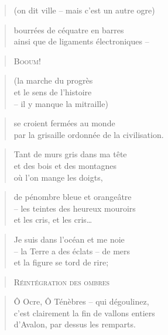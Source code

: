   \begin{verse}
    (on dit ville -- mais c’est un autre ogre)
  \end{verse}
  \begin{verse}
    bourrées de céquatre en barres\\
    ainsi que de ligaments électroniques --
  \end{verse}
  \begin{verse}
    \textsc{Booum!}
  \end{verse}
  \begin{verse}
    (la marche du progrès\\
    et le sens de l’histoire\\
    -- il y manque la mitraille)
  \end{verse}
  \begin{verse}
    se croient fermées au monde\\
    par la grisaille ordonnée de la civilisation.
  \end{verse}
  \begin{verse}
    Tant de murs gris dans ma tête\\
    et des bois et des montagnes\\
    où l’on mange les doigts,
  \end{verse}
  \begin{verse}
    de pénombre bleue et orangeâtre\\
    -- les teintes des heureux mouroirs\\
    et les cris, et les cris…
  \end{verse}
  \begin{verse}
    Je suis dans l’océan et me noie\\
    -- la Terre a des éclats -- de mers\\
    et la figure se tord de rire;
  \end{verse}
  \begin{verse}
    \textsc{Réintégration des ombres}
  \end{verse}
  \begin{verse}
    Ô Ocre, Ô Ténèbres -- qui dégoulinez,\\
    c’est clairement la fin de vallons entiers\\
    d’Avalon, par dessus les remparts.
  \end{verse}
